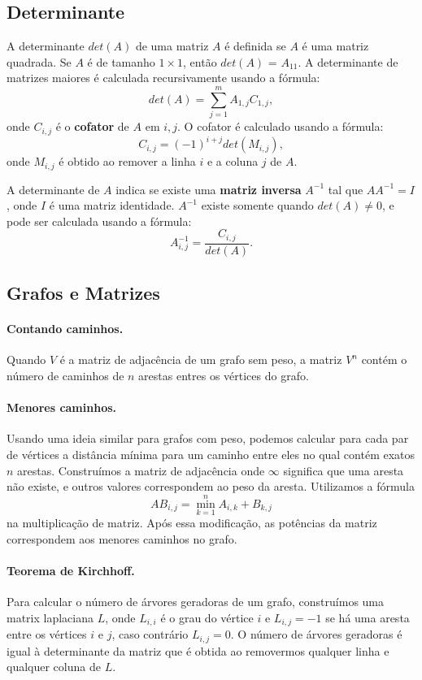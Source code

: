 \subsection{Determinante} 
A determinante $det(A)$ de uma matriz $A$ é definida se $A$ é uma matriz quadrada. Se $A$ é de tamanho $1\times 1$, então $det(A)$ = $A_{11}$. A determinante de matrizes maiores é calculada recursivamente usando a fórmula:
$$det(A) = \sum_{j=1}^{m}A_{1,j}C_{1,j},$$
onde $C_{i,j}$ é o \textbf{cofator} de $A$ em $i,j$. O cofator é calculado usando a fórmula:
$$C_{i,j} = (-1)^{i+j}det(M_{i,j}),$$
onde $M_{i,j}$ é obtido ao remover a linha $i$ e a coluna $j$ de $A$.

A determinante de $A$ indica se existe uma \textbf{matriz inversa} $A^{-1}$ tal que $AA^{-1} = I$, onde $I$ é uma matriz identidade. $A^{-1}$ existe somente quando $det(A) \neq 0$, e pode ser calculada usando a fórmula:
$$A^{-1}_{i,j} = \frac{C_{i,j}}{det(A)}.$$

\subsection{Grafos e Matrizes}
\paragraph{Contando caminhos.} Quando $V$ é a matriz de adjacência de um grafo sem peso, a matriz $V^n$ contém o número de caminhos de $n$ arestas entres os vértices do grafo.

\paragraph{Menores caminhos.} Usando uma ideia similar para grafos com peso, podemos calcular para cada par de vértices a distância mínima para um caminho entre eles no qual contém exatos $n$ arestas. Construímos a matriz de adjacência onde $\infty$ significa que uma aresta não existe, e outros valores correspondem ao peso da aresta. Utilizamos a fórmula
$$AB_{i,j} = \min_{k=1}^{n} A_{i,k}+B_{k,j}$$
na multiplicação de matriz. Após essa modificação, as potências da matriz correspondem aos menores caminhos no grafo.

\paragraph{Teorema de Kirchhoff.} Para calcular o número de árvores geradoras de um grafo, construímos uma matrix laplaciana $L$, onde $L_{i,i}$ é o grau do vértice $i$ e $L_{i,j} = -1$ se há uma aresta entre os vértices $i$ e $j$, caso contrário $L_{i,j} = 0$. O número de árvores geradoras é igual à determinante da matriz que é obtida ao removermos qualquer linha e qualquer coluna de $L$.